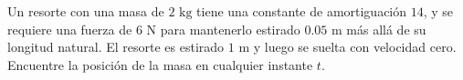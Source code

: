 \item Un resorte con una masa de $2 \text{ kg}$ tiene una constante de amortiguación $14$, y se requiere una fuerza de $6 \text{ N}$ para mantenerlo estirado $0.05 \text{ m}$ más allá de su longitud natural. El resorte es estirado $1 \text{ m}$ y luego se suelta con velocidad cero. Encuentre la posición de la masa en cualquier instante $t$.
